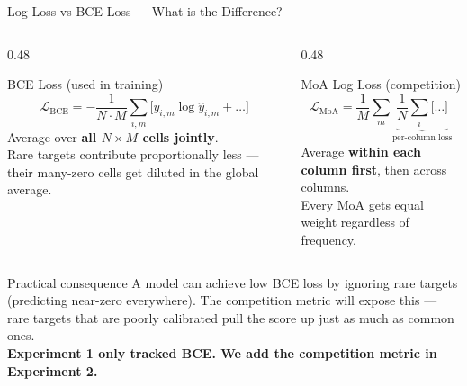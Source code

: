 \documentclass[aspectratio=169, 10pt]{beamer}
\begin{document}
\begin{frame}{Log Loss vs BCE Loss — What is the Difference?}
  \begin{columns}[T]
    \begin{column}{0.48\textwidth}
      \begin{block}{BCE Loss (used in training)}
        \[
          \mathcal{L}_{\text{BCE}} =
          -\frac{1}{N \cdot M}
          \sum_{i,m} \bigl[ y_{i,m} \log \hat{y}_{i,m}
          + \ldots \bigr]
        \]
        Average over \textbf{all $N \times M$ cells jointly}.\\[0.4em]
        Rare targets contribute proportionally less — their
        many-zero cells get diluted in the global average.
      \end{block}
    \end{column}
    \begin{column}{0.48\textwidth}
      \begin{block}{MoA Log Loss (competition)}
        \[
          \mathcal{L}_{\text{MoA}} =
          \frac{1}{M} \sum_m
          \underbrace{\frac{1}{N} \sum_i \bigl[\ldots\bigr]}_{\text{per-column loss}}
        \]
        Average \textbf{within each column first}, then across
        columns.\\[0.4em]
        Every MoA gets equal weight regardless of frequency.
      \end{block}
    \end{column}
  \end{columns}

  \vspace{0.5em}
  \begin{alertblock}{Practical consequence}
    A model can achieve low BCE loss by ignoring rare targets (predicting near-zero
    everywhere). The competition metric will expose this — rare targets that are
    poorly calibrated pull the score up just as much as common ones.\\[0.3em]
    \textbf{Experiment 1 only tracked BCE. We add the competition metric in Experiment 2.}
  \end{alertblock}
\end{frame}
\end{document}
